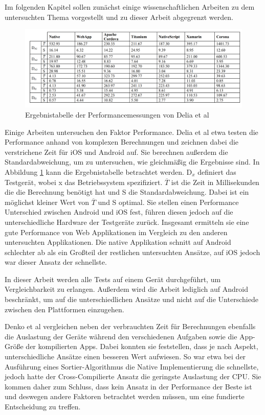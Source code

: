 Im folgenden Kapitel sollen zunächst einige wissenschaftlichen Arbeiten zu dem untersuchten Thema vorgestellt und zu dieser Arbeit abgegrenzt werden.

\begin{figure}[ht]
  \centering
  \includegraphics[width=\textwidth,keepaspectratio]{images/IEEE_Delia_Al.png}
  \caption[Ergebnistabelle der Performancemessungen von Delia et al]{Ergebnistabelle der Performancemessungen von Delia et al \cite{IEEE_development_classes}}
  \label{fig:result_table_IEEE_related_work}
\end{figure}

Einige Arbeiten untersuchen den Faktor Performance. Delia et al \cite{IEEE_development_classes} etwa testen die Performance anhand von komplexen Berechnungen und zeichnen dabei die verstrichene Zeit für iOS und Android auf. Sie berechnen außerdem die Standardabweichung, um zu untersuchen, wie gleichmäßig die Ergebnisse sind. In Abbildung \ref{fig:result_table_IEEE_related_work} kann die Ergebnistabelle betrachtet werden. D$_x$ definiert das Testgerät, wobei x das Betriebssystem spezifiziert. $\overline T$ ist die Zeit in Millisekunden die die Berechnung benötigt hat und S die Standardabweichung. Dabei ist ein möglichst kleiner Wert von $\overline T$ und S optimal. Sie stellen einen Performance Unterschied zwischen Android und iOS fest, führen diesen jedoch auf die unterschiedliche Hardware der Testgeräte zurück. Insgesamt ermitteln sie eine gute Performance von Web Applikationen im Vergleich zu den anderen untersuchten Applikationen. Die native Applikation schnitt auf Android schlechter ab als ein Großteil der restlichen untersuchten Ansätze, auf iOS jedoch war dieser Ansatz der schnellste.

In dieser Arbeit werden alle Tests auf einem Gerät durchgeführt, um Vergleichbarkeit zu erlangen. Außerdem wird die Arbeit lediglich auf Android beschränkt, um auf die unterschiedlichen Ansätze und nicht auf die Unterschiede zwischen den Plattformen einzugehen.
 
Denko et al \cite{Denko_performance} vergleichen neben der verbrauchten Zeit für Berechnungen ebenfalls die Auslastung der Geräte während den verschiedenen Aufgaben sowie die App-Größe der kompilierten Apps. Dabei konnten sie feststellen, dass je nach Aspekt, unterschiedliche Ansätze einen besseren Wert aufwiesen. So war etwa bei der Ausführung eines Sortier-Algorithmus die Native Implementierung die schnellste, jedoch hatte der Cross-Compilierte Ansatz die geringste Auslastung der CPU. Sie kommen daher zum Schluss, dass kein Ansatz in der Performance der Beste ist und deswegen andere Faktoren betrachtet werden müssen, um eine fundierte Entscheidung zu treffen.

